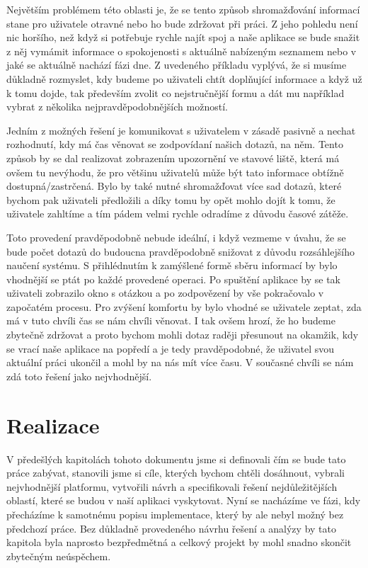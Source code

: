 \documentclass[thesis=M,czech]{FITthesis}[2012/06/26]
\begin{document}
Největším problémem této oblasti je, že se tento způsob shromažďování informací stane pro uživatele otravné nebo ho bude zdržovat při práci. Z jeho pohledu není nic horšího, než když si potřebuje rychle najít spoj a naše aplikace se bude snažit z něj vymámit informace o spokojenosti s aktuálně nabízeným seznamem nebo v jaké se aktuálně nachází fázi dne. Z uvedeného příkladu vyplývá, že si musíme důkladně rozmyslet, kdy budeme po uživateli chtít doplňující informace a když už k tomu dojde, tak především zvolit co nejstručnější formu a dát mu například vybrat z několika nejpravděpodobnějších možností.

Jedním z možných řešení je komunikovat s uživatelem v zásadě pasivně a nechat rozhodnutí, kdy má čas věnovat se zodpovídaní našich dotazů, na něm. Tento způsob by se dal realizovat zobrazením upozornění ve stavové liště, která má ovšem tu nevýhodu, že pro většinu uživatelů může být tato informace obtížně dostupná/zastrčená. Bylo by také nutné shromažďovat více sad dotazů, které bychom pak uživateli předložili a díky tomu by opět mohlo dojít k tomu, že uživatele zahltíme a tím pádem velmi rychle odradíme z důvodu časové zátěže.

Toto provedení pravděpodobně nebude ideální, i když vezmeme v úvahu, že se bude počet dotazů do budoucna pravděpodobně snižovat z důvodu rozsáhlejšího naučení systému. S přihlédnutím k zamýšlené formě sběru informací by bylo vhodnější se ptát po každé provedené operaci. Po spuštění aplikace by se tak uživateli zobrazilo okno s otázkou a po zodpovězení by vše pokračovalo v započatém procesu. Pro zvýšení komfortu by bylo vhodné se uživatele zeptat, zda má v tuto chvíli čas se nám chvíli věnovat. I tak ovšem hrozí, že ho budeme zbytečně zdržovat a proto bychom mohli dotaz raději přesunout na okamžik, kdy se vrací naše aplikace na popředí a je tedy pravděpodobné, že uživatel svou aktuální práci ukončil a mohl by na nás mít více času. V současné chvíli se nám zdá toto řešení jako nejvhodnější.

\chapter{Realizace}
V předešlých kapitolách tohoto dokumentu jsme si definovali čím se bude tato práce zabývat, stanovili jsme si cíle, kterých bychom chtěli dosáhnout, vybrali nejvhodnější platformu, vytvořili návrh a specifikovali řešení nejdůležitějších oblastí, které se budou v naší aplikaci vyskytovat. Nyní se nacházíme ve fázi, kdy přecházíme k samotnému popisu implementace, který by ale nebyl možný bez předchozí práce. Bez důkladně provedeného návrhu řešení a analýzy by tato kapitola byla naprosto bezpředmětná a celkový projekt by mohl snadno skončit zbytečným neúspěchem. 
\end{document}
